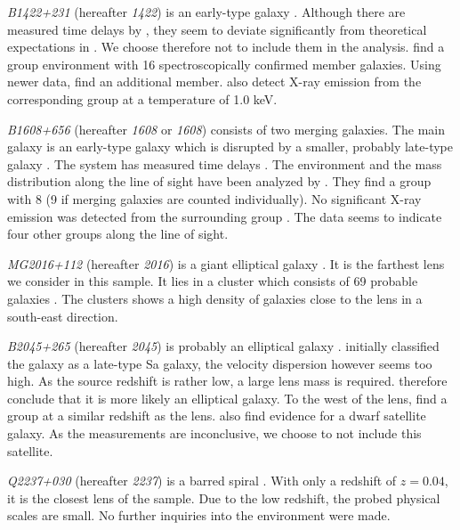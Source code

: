 \documentclass[useAMS,usenatbib]{mn2e}
\begin{document}
\textit{B1422+231} (hereafter \textit{1422}) is an early-type galaxy \citep{1996ApJ...462L..53I}. Although there are measured time delays by \cite{2001MNRAS.326.1403P}, they seem to deviate significantly from theoretical expectations in \cite{2003AJ....126...29R}. We choose therefore not to include them in the analysis. \cite{2006ApJ...641..169M} find a group environment with 16 spectroscopically confirmed member galaxies. Using newer data, \cite{2011ApJ...726...84W} find an additional member. \cite{2004ApJ...610..686G} also detect X-ray emission from the corresponding group at a temperature of 1.0 keV.

\textit{B1608+656} (hereafter \textit{1608} or \textit{1608}) consists of two merging galaxies. The main galaxy is an early-type galaxy which is disrupted by a smaller, probably late-type galaxy \citep{2003ApJ...584..100S}. The system has measured time delays \citep{2002ApJ...581..823F}. The environment and the mass distribution along the line of sight have been analyzed by \cite{2006ApJ...642...30F}. They find a group with 8 (9 if merging galaxies are counted individually). No significant X-ray emission was detected from the surrounding group \citep{2005ApJ...625..633D}. The data seems to indicate four other groups along the line of sight.

\textit{MG2016+112} (hereafter \textit{2016}) is a giant elliptical galaxy \citep{1984Sci...223...46L,1986AJ.....91..991S}. It is the farthest lens we consider in this sample. It lies in a cluster which consists of 69 probable galaxies \citep{2003MNRAS.344..337T}. The clusters shows a high density of galaxies close to the lens in a south-east direction.

\textit{B2045+265} (hereafter \textit{2045}) is probably an elliptical galaxy \citep{2007MNRAS.378..109M}. \cite{1999AJ....117..658F} initially classified the galaxy as a late-type Sa galaxy, the velocity dispersion however seems too high. As the source redshift is rather low, a large lens mass is required. \cite{2007MNRAS.378..109M} therefore conclude that it is more likely an elliptical galaxy. To the west of the lens, \cite{1999AJ....117..658F} find a group at a similar redshift as the lens. \cite{2007MNRAS.378..109M} also find evidence for a dwarf satellite galaxy. As the measurements are inconclusive, we choose to not include this satellite.

\textit{Q2237+030} (hereafter \textit{2237}) is a barred spiral \citep{1988AJ.....95.1331Y}. With only a redshift of $z=0.04$, it is the closest lens of the sample. Due to the low redshift, the probed physical scales are small. No further inquiries into the environment were made.
\end{document}
